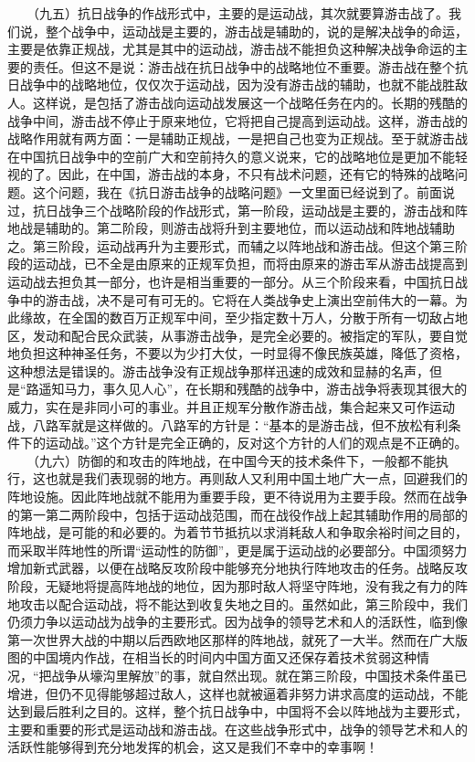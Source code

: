 \documentclass[cn,11pt,chinese]{elegantbook}
\begin{document}
　　（九五）抗日战争的作战形式中，主要的是运动战，其次就要算游击战了。我们说，整个战争中，运动战是主要的，游击战是辅助的，说的是解决战争的命运，主要是依靠正规战，尤其是其中的运动战，游击战不能担负这种解决战争命运的主要的责任。但这不是说：游击战在抗日战争中的战略地位不重要。游击战在整个抗日战争中的战略地位，仅仅次于运动战，因为没有游击战的辅助，也就不能战胜敌人。这样说，是包括了游击战向运动战发展这一个战略任务在内的。长期的残酷的战争中间，游击战不停止于原来地位，它将把自己提高到运动战。这样，游击战的战略作用就有两方面：一是辅助正规战，一是把自己也变为正规战。至于就游击战在中国抗日战争中的空前广大和空前持久的意义说来，它的战略地位是更加不能轻视的了。因此，在中国，游击战的本身，不只有战术问题，还有它的特殊的战略问题。这个问题，我在《抗日游击战争的战略问题》一文里面已经说到了。前面说过，抗日战争三个战略阶段的作战形式，第一阶段，运动战是主要的，游击战和阵地战是辅助的。第二阶段，则游击战将升到主要地位，而以运动战和阵地战辅助之。第三阶段，运动战再升为主要形式，而辅之以阵地战和游击战。但这个第三阶段的运动战，已不全是由原来的正规军负担，而将由原来的游击军从游击战提高到运动战去担负其一部分，也许是相当重要的一部分。从三个阶段来看，中国抗日战争中的游击战，决不是可有可无的。它将在人类战争史上演出空前伟大的一幕。为此缘故，在全国的数百万正规军中间，至少指定数十万人，分散于所有一切敌占地区，发动和配合民众武装，从事游击战争，是完全必要的。被指定的军队，要自觉地负担这种神圣任务，不要以为少打大仗，一时显得不像民族英雄，降低了资格，这种想法是错误的。游击战争没有正规战争那样迅速的成效和显赫的名声，但是“路遥知马力，事久见人心”，在长期和残酷的战争中，游击战争将表现其很大的威力，实在是非同小可的事业。并且正规军分散作游击战，集合起来又可作运动战，八路军就是这样做的。八路军的方针是：“基本的是游击战，但不放松有利条件下的运动战。”这个方针是完全正确的，反对这个方针的人们的观点是不正确的。\\
　　（九六）防御的和攻击的阵地战，在中国今天的技术条件下，一般都不能执行，这也就是我们表现弱的地方。再则敌人又利用中国土地广大一点，回避我们的阵地设施。因此阵地战就不能用为重要手段，更不待说用为主要手段。然而在战争的第一第二两阶段中，包括于运动战范围，而在战役作战上起其辅助作用的局部的阵地战，是可能的和必要的。为着节节抵抗以求消耗敌人和争取余裕时间之目的，而采取半阵地性的所谓“运动性的防御”，更是属于运动战的必要部分。中国须努力增加新式武器，以便在战略反攻阶段中能够充分地执行阵地攻击的任务。战略反攻阶段，无疑地将提高阵地战的地位，因为那时敌人将坚守阵地，没有我之有力的阵地攻击以配合运动战，将不能达到收复失地之目的。虽然如此，第三阶段中，我们仍须力争以运动战为战争的主要形式。因为战争的领导艺术和人的活跃性，临到像第一次世界大战的中期以后西欧地区那样的阵地战，就死了一大半。然而在广大版图的中国境内作战，在相当长的时间内中国方面又还保存着技术贫弱这种情况，“把战争从壕沟里解放”的事，就自然出现。就在第三阶段，中国技术条件虽已增进，但仍不见得能够超过敌人，这样也就被逼着非努力讲求高度的运动战，不能达到最后胜利之目的。这样，整个抗日战争中，中国将不会以阵地战为主要形式，主要和重要的形式是运动战和游击战。在这些战争形式中，战争的领导艺术和人的活跃性能够得到充分地发挥的机会，这又是我们不幸中的幸事啊！\\
\end{document}
